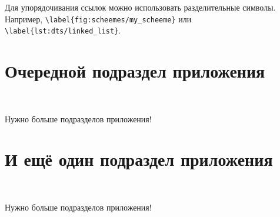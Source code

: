 \begin{table}[htbp]
        \captionsetup{justification=centering}
\end{table}


Для упорядочивания ссылок можно использовать разделительные символы.
Например, \verb+\label{fig:scheemes/my_scheeme}+ или \\ \verb+\label{lst:dts/linked_list}+.

\section{Очередной подраздел приложения}~\label{app:B5}

Нужно больше подразделов приложения!

\section{И ещё один подраздел приложения}~\label{app:B6}

Нужно больше подразделов приложения!

\clearpage
{}


